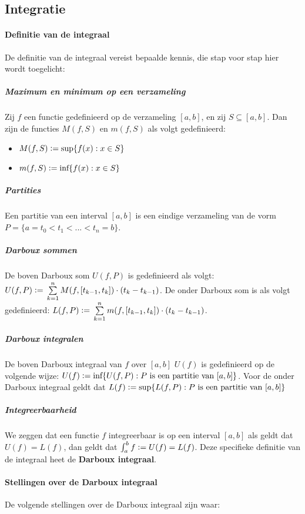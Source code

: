 \subsection{Integratie}
\paragraph{Definitie van de integraal} De definitie van de integraal vereist bepaalde kennis, die stap voor stap hier wordt toegelicht:
\subparagraph{Maximum en minimum op een verzameling} Zij $f$ een functie gedefinieerd op de verzameling $[a,b]$, en zij $S\subseteq[a,b]$. Dan zijn de functies $M(f,S)$ en $m(f,S)$ als volgt gedefinieerd:

\begin{itemize}
  \setlength\itemsep{0em}
  \item $M(f,S)\vcentcolon=\text{sup}\{f(x):x\in S\}$
  \item $m(f,S)\vcentcolon=\text{inf}\{f(x):x\in S\}$
\end{itemize}

\subparagraph{Partities} Een partitie van een interval $[a,b]$ is een eindige verzameling van de vorm $P=\{a=t_{0}<t_{1}<...<t_{n}=b\}$.

\subparagraph{Darboux sommen} De boven Darboux som $U(f,P)$ is gedefinieerd als volgt: $U(f,P)\vcentcolon=\\\sum\limits_{k=1}^{n}M(f,[t_{k-1},t_{k}])\cdot(t_{k}-t_{k-1})$. De onder Darboux som is als volgt gedefinieerd: $L(f,P)\vcentcolon=\\\sum\limits_{k=1}^{n}m(f,[t_{k-1},t_{k}])\cdot(t_{k}-t_{k-1})$.

\subparagraph{Darboux integralen} De boven Darboux integraal van $f$ over $[a,b]$ $U(f)$ is gedefinieerd op de volgende wijze: $U(f)\vcentcolon=\text{inf}\{U(f,P):P\text{ is een partitie van }[a,b]\}$. Voor de onder Darboux integraal geldt dat $L(f)\vcentcolon=\text{sup}\{L(f,P):P\text{ is een partitie van }[a,b]\}$

\subparagraph{Integreerbaarheid} We zeggen dat een functie $f$ integreerbaar is op een interval $[a,b]$ als geldt dat $U(f)=L(f)$, dan geldt dat $\int_a^{b}f\vcentcolon= U(f)=L(f)$. Deze specifieke definitie van de integraal heet de \textbf{Darboux integraal}.

\paragraph{Stellingen over de Darboux integraal} De volgende stellingen over de Darboux integraal zijn waar:

